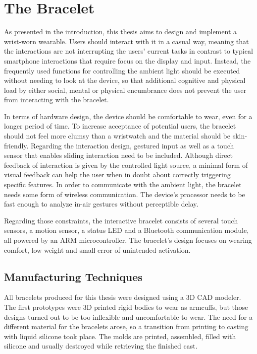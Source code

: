 \chapter{The Bracelet}
\label{chap:bracelet}
As presented in the introduction, this thesis aims to design and implement a wrist-worn wearable. Users should interact with it in a casual way, meaning that the interactions are not interrupting the users' current tasks in contrast to typical smartphone interactions that require focus on the display and input. Instead, the frequently used functions for controlling the ambient light should be executed without needing to look at the device, so that additional cognitive and physical load by either social, mental or physical encumbrance does not prevent the user from interacting with the bracelet.

In terms of hardware design, the device should be comfortable to wear, even for a longer period of time. To increase acceptance of potential users, the bracelet should not feel more clumsy than a wristwatch and the material should be skin-friendly. Regarding the interaction design, gestured input as well as a touch sensor that enables sliding interaction need to be included. Although direct feedback of interaction is given by the controlled light source, a minimal form of visual feedback can help the user when in doubt about correctly triggering specific features. In order to communicate with the ambient light, the bracelet needs some form of wireless communication. The device's processor needs to be fast enough to analyze in-air gestures without perceptible delay.

Regarding those constraints, the interactive bracelet consists of several touch sensors, a motion sensor, a status \ac{LED} and a Bluetooth communication module, all powered by an ARM microcontroller. The bracelet's design focuses on wearing comfort, low weight and small error of unintended activation.

\section{Manufacturing Techniques}

All bracelets produced for this thesis were designed using a 3D \ac{CAD} modeler. The first prototypes were 3D printed rigid bodies to wear as armcuffs, but those designs turned out to be too inflexible and uncomfortable to wear. The need for a different material for the bracelets arose, so a transition from printing to casting with liquid silicone took place. The molds are printed, assembled, filled with silicone and usually destroyed while retrieving the finished cast.

